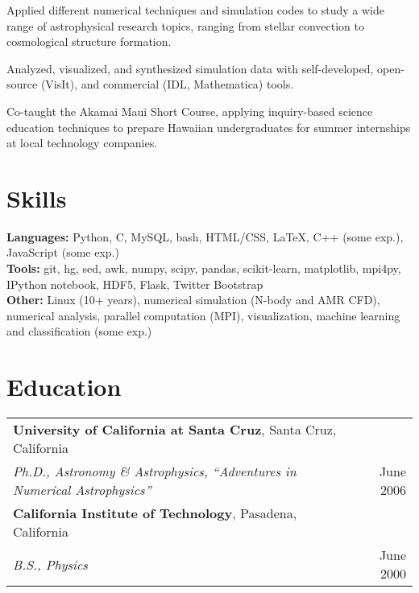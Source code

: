 \begin{resume}
\begin{list1}
\item Applied different numerical techniques and simulation codes to study a wide range of astrophysical research topics, ranging from stellar convection to cosmological structure formation.
\item Analyzed, visualized, and synthesized simulation data with self-developed, open-source (VisIt), and commercial (IDL, Mathematica) tools.
\item Co-taught the Akamai Maui Short Course, applying inquiry-based science education techniques to prepare Hawaiian undergraduates for summer internships at local technology companies.
\end{list1}



\section{\sc Skills}
\textbf{Languages:} Python, C, MySQL, bash, HTML/CSS, \LaTeX, C++ (some exp.), JavaScript (some exp.) \vspace{0.05in} \\
\textbf{Tools:} git, hg, sed, awk, numpy, scipy, pandas, scikit-learn, matplotlib, mpi4py, IPython notebook, HDF5, Flask, Twitter Bootstrap \vspace{0.05in} \\
\textbf{Other:} Linux (10+ years), numerical simulation (N-body and AMR CFD), numerical analysis, parallel computation (MPI), visualization, machine learning and classification (some exp.) 

\section{\sc Education}
\hspace*{-0.1in}
\begin{tabularx}{1.025\textwidth}{Xr}
\textbf{University of California at Santa Cruz}, Santa Cruz, California & \\
\hspace{0.25in} \textit{Ph.D., Astronomy \& Astrophysics, ``Adventures in Numerical Astrophysics''} & June 2006 \\[0.1in]
\textbf{California Institute of Technology}, Pasadena, California & \\
\hspace{0.25in} \textit{B.S., Physics} & June 2000 \\
\end{tabularx}


\end{resume}
